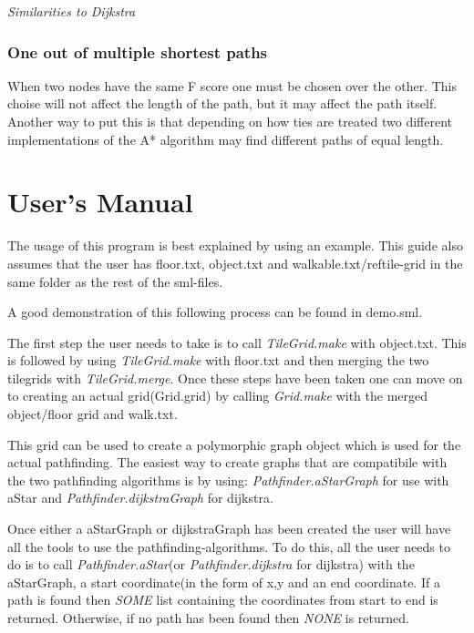 \documentclass[12pt, a4paper]{article}
\begin{document}
\textit{Similarities to Dijkstra}




\subsubsection{One out of multiple shortest paths}

When two nodes have the same F score one must be chosen over the other. This
choise will not affect the length of the path, but it may affect the path
itself. Another way to put this is that depending on how ties are treated two
different implementations of the A* algorithm may find different paths of equal
length. \cite{astar2}


\section{User's Manual}

The usage of this program is best explained by using an example. This guide also assumes that
the user has floor.txt, object.txt and walkable.txt/ref{tile-grid} in the same folder as the rest of
the sml-files.

A good demonstration of this following process can be found in demo.sml.

The first step the user needs to take is to call \textit{TileGrid.make} with object.txt. This is followed
by using \textit{TileGrid.make} with floor.txt and then merging the two tilegrids with \textit{TileGrid.merge}.
Once these steps have been taken one can move on to creating an actual grid(Grid.grid) by calling
\textit{Grid.make} with the merged object/floor grid and walk.txt.

This grid can be used to create a polymorphic graph object which is used for the actual pathfinding.
The easiest way to create graphs that are compatibile with the two pathfinding algorithms is by using:
\textit{Pathfinder.aStarGraph} for use with aStar and \textit{Pathfinder.dijkstraGraph} for dijkstra.

Once either a aStarGraph or dijkstraGraph has been created the user will have all the tools to
use the pathfinding-algorithms. To do this, all the user needs to do is to call \textit{Pathfinder.aStar}(or
\textit{Pathfinder.dijkstra} for dijkstra) with the aStarGraph, a start coordinate(in the form of x,y and an end coordinate.
If a path is found then \textit{SOME} list containing the coordinates from start to end is returned. Otherwise, if no path has
been found then \textit{NONE} is returned.
\end{document}
